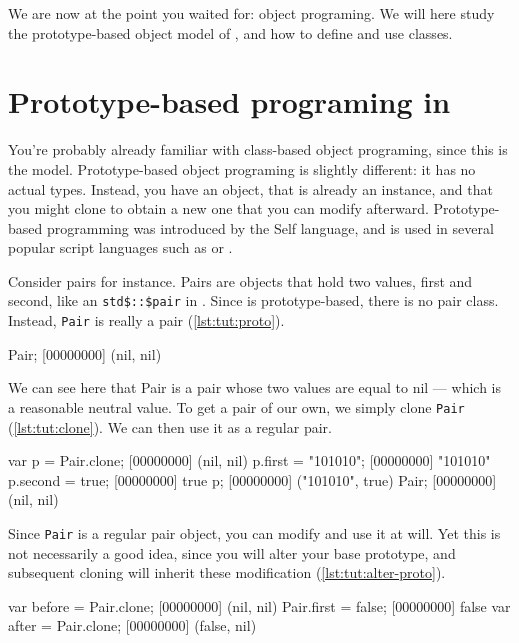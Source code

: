 We are now at the point you waited for: object programing. We will
here study the prototype-based object model of \us, and how to
define and use classes.

\section{Prototype-based programing in \us}

You're probably already familiar with class-based object programing,
since this is the \Cxx model. Prototype-based object programing is
slightly different: it has no actual types. Instead, you have an
object, that is already an instance, and that you might clone to
obtain a new one that you can modify afterward. Prototype-based
programming was introduced by the Self language, and is used in
several popular script languages such as \io or \js.

Consider pairs for instance. Pairs are objects that hold two values,
first and second, like an \lstinline{std$::$pair} in \Cxx. Since \us is
prototype-based, there is no pair class. Instead, \lstinline|Pair| is
really a pair (\autoref{lst:tut:proto}).

\begin{urbiscript}[caption=Prototypes in \us, label=lst:tut:proto]
Pair;
[00000000] (nil, nil)
\end{urbiscript}

We can see here that Pair is a pair whose two values are equal to nil
--- which is a reasonable neutral value. To get a pair of our own, we
simply clone \lstinline|Pair| (\autoref{lst:tut:clone}). We can then use it as a
regular pair.

\begin{urbiscript}[caption=Cloning, label=lst:tut:clone]
var p = Pair.clone;
[00000000] (nil, nil)
p.first = "101010";
[00000000] "101010"
p.second = true;
[00000000] true
p;
[00000000] ("101010", true)
Pair;
[00000000] (nil, nil)
\end{urbiscript}

Since \lstinline|Pair| is a regular pair object, you can modify and
use it at will. Yet this is not necessarily a good idea, since you
will alter your base prototype, and subsequent cloning will inherit
these modification (\autoref{lst:tut:alter-proto}).

\begin{urbiscript}[caption=Altering a prototype, label=lst:tut:alter-proto]
var before = Pair.clone;
[00000000] (nil, nil)
Pair.first = false;
[00000000] false
var after = Pair.clone;
[00000000] (false, nil)
\end{urbiscript}

